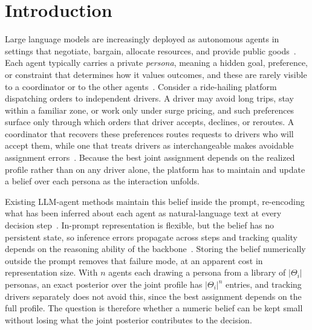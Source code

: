 \documentclass[letterpaper]{article} %
\begin{document}
\section{Introduction}
\label{sec:intro}

Large language models are increasingly deployed as autonomous agents in settings that negotiate, bargain, allocate resources, and provide public goods~\citep{wu2023autogen,li2023camel,hong2024metagpt,park2023generative,meta2022human}. Each agent typically carries a private \emph{persona}, meaning a hidden goal, preference, or constraint that determines how it values outcomes, and these are rarely visible to a coordinator or to the other agents~\citep{zhou2024sotopia,abdulhai2023lmrl}. Consider a ride-hailing platform dispatching orders to independent drivers. A driver may avoid long trips, stay within a familiar zone, or work only under surge pricing, and such preferences surface only through which orders that driver accepts, declines, or reroutes. A coordinator that recovers these preferences routes requests to drivers who will accept them, while one that treats drivers as interchangeable makes avoidable assignment errors~\citep{mu2026adaptive,yi2025debate}. Because the best joint assignment depends on the realized profile rather than on any driver alone, the platform has to maintain and update a belief over each persona as the interaction unfolds.

Existing LLM-agent methods maintain this belief inside the prompt, re-encoding what has been inferred about each agent as natural-language text at every decision step~\citep{yi2025debate,mu2026adaptive}. In-prompt representation is flexible, but the belief has no persistent state, so inference errors propagate across steps and tracking quality depends on the reasoning ability of the backbone~\citep{park2024llm}. Storing the belief numerically outside the prompt removes that failure mode, at an apparent cost in representation size. With $n$ agents each drawing a persona from a library of $|\Theta_i|$ personas, an exact posterior over the joint profile has $|\Theta_i|^n$ entries, and tracking drivers separately does not avoid this, since the best assignment depends on the full profile. The question is therefore whether a numeric belief can be kept small without losing what the joint posterior contributes to the decision.
\end{document}
